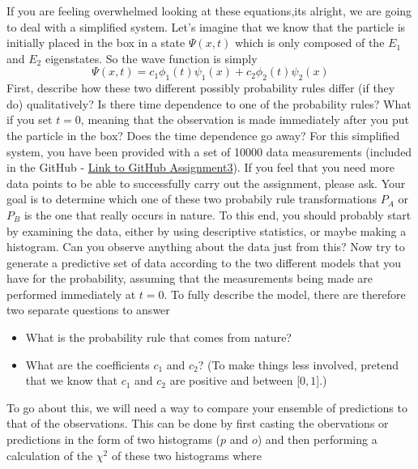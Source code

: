 \documentclass[12pt]{article}
\begin{document}
If you are feeling overwhelmed looking at these equations,its alright, we are going to deal with a simplified system.  Let's imagine that we know that the particle is initially placed in the box in a state $\Psi(x,t)$ which is only composed of the $E_1$ and $E_2$ eigenstates.  So the wave function is simply 
\begin{displaymath}
\Psi(x,t)=c_{1}\phi_{1}(t)\psi_{1}(x)+c_{2}\phi_{2}(t)\psi_{2}(x)
\end{displaymath}
First, describe how these two different possibly probability rules differ (if they do) qualitatively?  Is there time dependence to one of the probability rules?  What if you set $t=$0, meaning that the observation is made immediately after you put the particle in the box?  Does the time dependence go away?
\newline
\newline
For this simplified system, you have been provided with a set of 10000 data measurements (included in the GitHub - \href{https://github.com/smeehan12/LifeOfAParticle/tree/master/Assignments/assignment3}{Link to GitHub Assignment3}).  If you feel that you need more data points to be able to successfully carry out the assignment, please ask.  Your goal is to determine which one of these two probabily rule transformations $P_{A}$ or $P_{B}$ is the one that really occurs in nature.  To this end, you should probably start by examining the data, either by using descriptive statistics, or maybe making a histogram.  Can you observe anything about the data just from this?  Now try to generate a predictive set of data according to the two different models that you have for the probability, assuming that the measurements being made are performed immediately at $t=$0.  
\newline
\newline
To fully describe the model, there are therefore two separate questions to answer
\begin{itemize}[noitemsep]
\item What is the probability rule that comes from nature?
\item What are the coefficients $c_1$ and $c_2$? (To make things less involved, pretend that we know that $c_1$ and $c_2$ are positive and between [$0,1$].)
\end{itemize}
To go about this, we will need a way to compare your ensemble of predictions to that of the observations.  This can be done by first casting the obervations or predictions in the form of two histograms ($p$ and $o$) and then performing a calculation of the $\chi^{2}$ of these two histograms where
\end{document}
